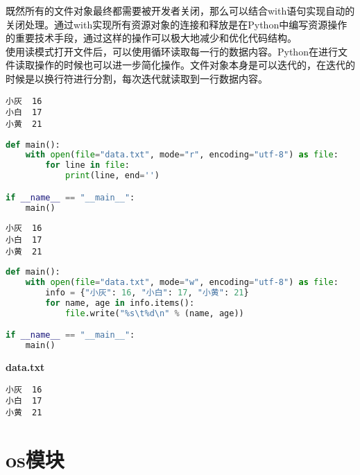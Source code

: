 既然所有的文件对象最终都需要被开发者关闭，那么可以结合with语句实现自动的关闭处理。通过with实现所有资源对象的连接和释放是在Python中编写资源操作的重要技术手段，通过这样的操作可以极大地减少和优化代码结构。\\

使用读模式打开文件后，可以使用循环读取每一行的数据内容。Python在进行文件读取操作的时候也可以进一步简化操作。文件对象本身是可以迭代的，在迭代的时候是以换行符进行分割，每次迭代就读取到一行数据内容。\\


\begin{lstlisting}[title=data.txt]
小灰	16
小白	17
小黄	21
\end{lstlisting}

\begin{lstlisting}[language=Python, title=read\_file.py]
def main():
	with open(file="data.txt", mode="r", encoding="utf-8") as file:
		for line in file:
			print(line, end='')

if __name__ == "__main__":
	main()
\end{lstlisting}

\begin{tcolorbox}
	\begin{verbatim}
小灰	16
小白	17
小黄	21
\end{verbatim}
\end{tcolorbox}

\vspace{0.5cm}


\begin{lstlisting}[language=Python]
def main():
	with open(file="data.txt", mode="w", encoding="utf-8") as file:
		info = {"小灰": 16, "小白": 17, "小黄": 21}
		for name, age in info.items():
			file.write("%s\t%d\n" % (name, age))

if __name__ == "__main__":
	main()
\end{lstlisting}

\begin{tcolorbox}
	\textbf{data.txt}
	\begin{verbatim}
小灰	16
小白	17
小黄	21
\end{verbatim}
\end{tcolorbox}

\newpage

\section{os模块}

